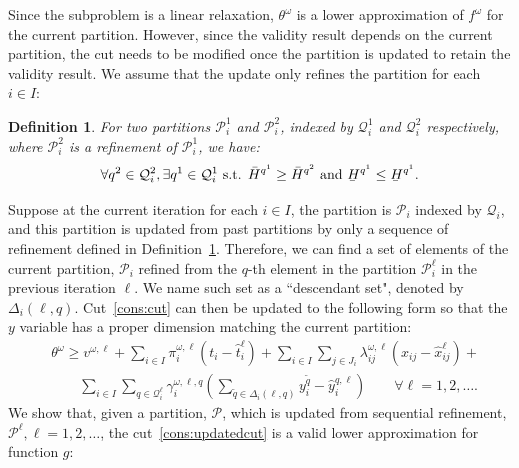 \documentclass[11pt]{article}
\newtheorem{definition}{Definition}
\newcommand{\noi}{\noindent}
\renewcommand{\underbar}{\underaccent{\bar}}
\begin{document}
	Since the subproblem is a linear relaxation, \(\theta^\omega\) is a lower approximation of \(f^\omega\) for the current partition. However, since the validity result depends on the current partition, the cut needs to be modified once the partition is updated to retain the validity result. We assume that the update only refines the partition for each \(i \in I\):
	\begin{definition} \label{definition:refinement}
		For two partitions \(\mathcal{P}^1_i\) and \(\mathcal{P}^2_i\), indexed by \(\mathcal{Q}^1_i\) and \(\mathcal{Q}^2_i\) respectively, where \(\mathcal{P}^2_i\) is a refinement of \(\mathcal{P}^1_i\), we have:
		\begin{equation*}
		\forall q^2 \in \mathcal{Q}^2_i, \exists q^1 \in \mathcal{Q}^1_i \text{ s.t. } \bar{H}^{q^1} \geq \bar{H}^{q^2} \text{ and } \underbar{H}^{q^1} \leq \underbar{H}^{q^1}.
		\end{equation*}
	\end{definition}
	\noi Suppose at the current iteration for each \(i \in I\), the partition is \(\mathcal{P}_i\) indexed by \(\mathcal{Q}_i\), and this partition is updated from past partitions by only a sequence of refinement defined in Definition~\ref{definition:refinement}. Therefore, we can find a set of elements of the current partition,  \(\mathcal{P}_i\) refined from the \(q\)-th element in the partition \(\mathcal{P}^\ell_i\) in the previous iteration \(\ell\). We name such set as a ``descendant set", denoted by \(\Delta_i(\ell,q)\). Cut~\eqref{cons:cut} can then be updated to the following form so that the \(y\) variable has a proper dimension matching the current partition:
	\begin{align} \label{cons:updatedcut}
	& \theta^\omega \geq v^{\omega,\ell} + \sum_{i \in I} \pi_i^{\omega,\ell} (t_i - \hat{t}_i^{\ell}) + \sum_{i \in I} \sum_{j \in J_i} \lambda_{ij}^{\omega,\ell} (x_{ij} - \hat{x}_{ij}^{\ell}) + \nonumber \\
	& \qquad \sum_{i \in I} \sum_{q \in \mathcal{Q}^{\ell}_i} \gamma_{i}^{\omega,\ell,q} \left( \sum_{\tilde{q} \in \Delta_i(\ell,q)} y_i^{\tilde{q}} - \hat{y}_i^{q,\ell} \right) \qquad \forall \ell = 1,2, \dots.
	\end{align}
	We show that, given a partition, \(\mathcal{P}\), which is updated from sequential refinement, \(\mathcal{P}^\ell, \ell = 1,2,\dots\), the cut~\eqref{cons:updatedcut} is a valid lower approximation for function \(g\):
\end{document}
